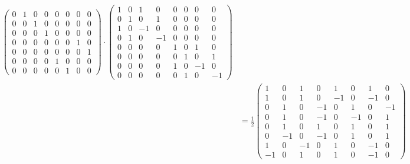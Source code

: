 \documentclass[10pt]{article}
\theoremstyle{definition}
\begin{document}
\begin{align*}
\begin{pmatrix}
                            0 & 1 & 0 & 0 & 0 & 0 & 0 & 0 \\
                            0 & 0 & 1 & 0 & 0 & 0 & 0 & 0 \\
                            0 & 0 & 0 & 1 & 0 & 0 & 0 & 0 \\
                            0 & 0 & 0 & 0 & 0 & 0 & 1 & 0 \\
                            0 & 0 & 0 & 0 & 0 & 0 & 0 & 1 \\
                            0 & 0 & 0 & 0 & 1 & 0 & 0 & 0 \\
                            0 & 0 & 0 & 0 & 0 & 1 & 0 & 0
                          \end{pmatrix}\cdot
  \begin{pmatrix}
    1 & 0 & 1  & 0  & 0 & 0 & 0  & 0  \\
    0 & 1 & 0  & 1  & 0 & 0 & 0  & 0  \\
    1 & 0 & -1 & 0  & 0 & 0 & 0  & 0  \\
    0 & 1 & 0  & -1 & 0 & 0 & 0  & 0  \\
    0 & 0 & 0  & 0  & 1 & 0 & 1  & 0  \\
    0 & 0 & 0  & 0  & 0 & 1 & 0  & 1  \\
    0 & 0 & 0  & 0  & 1 & 0 & -1 & 0  \\
    0 & 0 & 0  & 0  & 0 & 1 & 0  & -1
  \end{pmatrix}                                          \\
                        & = \frac{1}{2}\begin{pmatrix}
                                         1  & 0  & 1  & 0  & 1  & 0  & 1  & 0  \\
                                         1  & 0  & 1  & 0  & -1 & 0  & -1 & 0  \\
                                         0  & 1  & 0  & -1 & 0  & 1  & 0  & -1 \\
                                         0  & 1  & 0  & -1 & 0  & -1 & 0  & 1  \\
                                         0  & 1  & 0  & 1  & 0  & 1  & 0  & 1  \\
                                         0  & -1 & 0  & -1 & 0  & 1  & 0  & 1  \\
                                         1  & 0  & -1 & 0  & 1  & 0  & -1 & 0  \\
                                         -1 & 0  & 1  & 0  & 1  & 0  & -1 & 0
                                       \end{pmatrix}
\end{align*}
\end{document}
